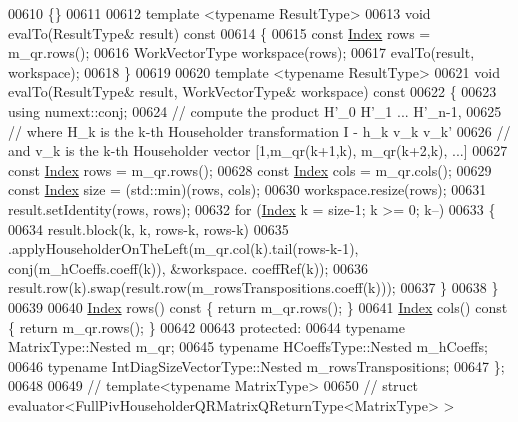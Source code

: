 \begin{DoxyCode}
00610   \{\}
00611 
00612   \textcolor{keyword}{template} <\textcolor{keyword}{typename} ResultType>
00613   \textcolor{keywordtype}{void} evalTo(ResultType& result)\textcolor{keyword}{ const}
00614 \textcolor{keyword}{  }\{
00615     \textcolor{keyword}{const} \hyperlink{namespace_eigen_a62e77e0933482dafde8fe197d9a2cfde}{Index} rows = m\_qr.rows();
00616     WorkVectorType workspace(rows);
00617     evalTo(result, workspace);
00618   \}
00619 
00620   \textcolor{keyword}{template} <\textcolor{keyword}{typename} ResultType>
00621   \textcolor{keywordtype}{void} evalTo(ResultType& result, WorkVectorType& workspace)\textcolor{keyword}{ const}
00622 \textcolor{keyword}{  }\{
00623     \textcolor{keyword}{using} numext::conj;
00624     \textcolor{comment}{// compute the product H'\_0 H'\_1 ... H'\_n-1,}
00625     \textcolor{comment}{// where H\_k is the k-th Householder transformation I - h\_k v\_k v\_k'}
00626     \textcolor{comment}{// and v\_k is the k-th Householder vector [1,m\_qr(k+1,k), m\_qr(k+2,k), ...]}
00627     \textcolor{keyword}{const} \hyperlink{namespace_eigen_a62e77e0933482dafde8fe197d9a2cfde}{Index} rows = m\_qr.rows();
00628     \textcolor{keyword}{const} \hyperlink{namespace_eigen_a62e77e0933482dafde8fe197d9a2cfde}{Index} cols = m\_qr.cols();
00629     \textcolor{keyword}{const} \hyperlink{namespace_eigen_a62e77e0933482dafde8fe197d9a2cfde}{Index} size = (std::min)(rows, cols);
00630     workspace.resize(rows);
00631     result.setIdentity(rows, rows);
00632     \textcolor{keywordflow}{for} (\hyperlink{namespace_eigen_a62e77e0933482dafde8fe197d9a2cfde}{Index} k = size-1; k >= 0; k--)
00633     \{
00634       result.block(k, k, rows-k, rows-k)
00635             .applyHouseholderOnTheLeft(m\_qr.col(k).tail(rows-k-1), conj(m\_hCoeffs.coeff(k)), &workspace.
      coeffRef(k));
00636       result.row(k).swap(result.row(m\_rowsTranspositions.coeff(k)));
00637     \}
00638   \}
00639 
00640   \hyperlink{namespace_eigen_a62e77e0933482dafde8fe197d9a2cfde}{Index} rows()\textcolor{keyword}{ const }\{ \textcolor{keywordflow}{return} m\_qr.rows(); \}
00641   \hyperlink{namespace_eigen_a62e77e0933482dafde8fe197d9a2cfde}{Index} cols()\textcolor{keyword}{ const }\{ \textcolor{keywordflow}{return} m\_qr.rows(); \}
00642 
00643 \textcolor{keyword}{protected}:
00644   \textcolor{keyword}{typename} MatrixType::Nested m\_qr;
00645   \textcolor{keyword}{typename} HCoeffsType::Nested m\_hCoeffs;
00646   \textcolor{keyword}{typename} IntDiagSizeVectorType::Nested m\_rowsTranspositions;
00647 \};
00648 
00649 \textcolor{comment}{// template<typename MatrixType>}
00650 \textcolor{comment}{// struct evaluator<FullPivHouseholderQRMatrixQReturnType<MatrixType> >}

\end{DoxyCode}
